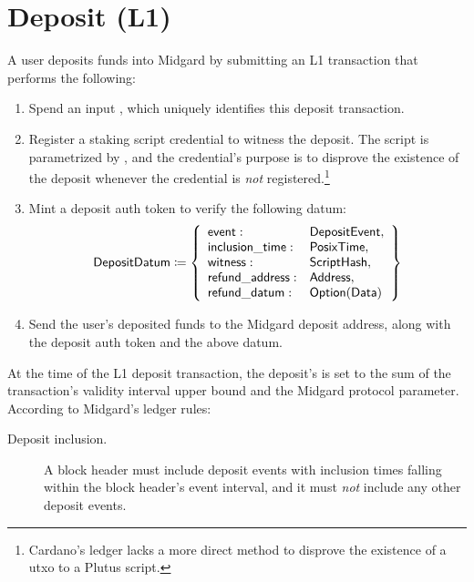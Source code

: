 \documentclass[../midgard.tex]{subfiles}
\begin{document}
\section{Deposit (L1)}
\label{h:deposit}

A user deposits funds into Midgard by submitting an L1 transaction that performs the following:
\begin{enumerate}
    \item Spend an input , which uniquely identifies this deposit transaction.
    \item Register a staking script credential to witness the deposit.
      The script is parametrized by , and the credential's purpose is to disprove the existence of the deposit whenever the credential is \emph{not} registered.\footnote{Cardano's ledger lacks a more direct method to disprove the existence of a utxo to a Plutus script.}
    \item Mint a deposit auth token to verify the following datum:
        \begin{equation*}
        \mathsf{DepositDatum} \coloneq \left\{
            \begin{array}{ll}
                \mathsf{event} : & \mathsf{DepositEvent}, \\
                \mathsf{inclusion\_time} : & \mathsf{PosixTime}, \\
                \mathsf{witness} : & \mathsf{ScriptHash}, \\
                \mathsf{refund\_address}: & \mathsf{Address}, \\
                \mathsf{refund\_datum}: & \mathsf{Option(Data)}
            \end{array}
            \right\}
        \end{equation*}
    \item Send the user's deposited funds to the Midgard deposit address, along with the deposit auth token and the above datum.
\end{enumerate}

At the time of the L1 deposit transaction, the deposit's  is set to the sum of the transaction's validity interval upper bound and the  Midgard protocol parameter.
According to Midgard's ledger rules:
\begin{description}
    \item[Deposit inclusion.] A block header must include deposit events with inclusion times falling within the block header's event interval, and it must \emph{not} include any other deposit events.
\end{description}
\end{document}
